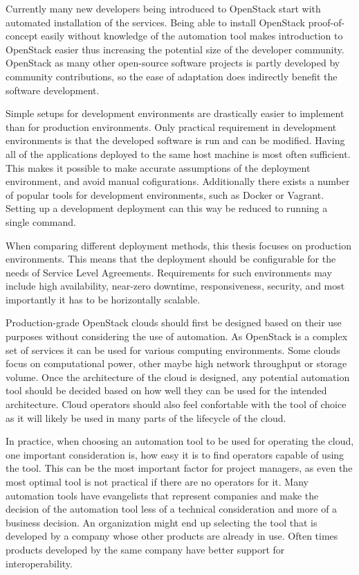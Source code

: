\documentclass[officiallayout]{tktla}
\begin{document}
Currently many new developers being introduced to OpenStack start with
automated installation of the services. Being able to install OpenStack
proof-of-concept easily without knowledge of the automation tool makes
introduction to OpenStack easier thus increasing the potential size of the
developer community. OpenStack as many other open-source software projects is
partly developed by community contributions, so the ease of adaptation does
indirectly benefit the software development.

Simple setups for development environments are drastically easier to implement
than for production environments. Only practical requirement in development
environments is that the developed software is run and can be modified. Having
all of the applications deployed to the same host machine is most often
sufficient. This makes it possible to make accurate assumptions of the
deployment environment, and avoid manual cofigurations. Additionally there
exists a number of popular tools for development environments, such as Docker
or Vagrant. Setting up a development deployment can this way be reduced to
running a single command.

When comparing different deployment methods, this thesis focuses on production
environments. This means that the deployment should be configurable for the
needs of Service Level Agreements. Requirements for such environments may
include high availability, near-zero downtime, responsiveness, security, and
most importantly it has to be horizontally scalable.

Production-grade OpenStack clouds should first be designed based on their use
purposes without considering the use of automation. As OpenStack is a complex
set of services it can be used for various computing environments. Some clouds
focus on computational power, other maybe high network throughput or storage
volume. Once the architecture of the cloud is designed, any potential
automation tool should be decided based on how well they can be used for the
intended architecture. Cloud operators should also feel confortable with the
tool of choice as it will likely be used in many parts of the lifecycle of the
cloud.

In practice, when choosing an automation tool to be used for operating the
cloud, one important consideration is, how easy it is to find operators capable
of using the tool. This can be the most important factor for project managers,
as even the most optimal tool is not practical if there are no operators for
it. Many automation tools have evangelists that represent companies and make
the decision of the automation tool less of a technical consideration and more
of a business decision. An organization might end up selecting the tool that is
developed by a company whose other products are already in use. Often times
products developed by the same company have better support for
interoperability.
\end{document}
